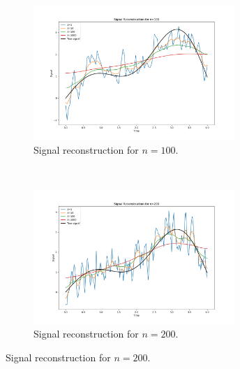 \documentclass{article}
\begin{document}
\begin{figure}[t!]
    \centering
    \caption{Signal reconstructions and error analysis for different problem sizes.}
    \label{fig:signal_reconstructions_and_error_analysis}
    
    \begin{subfigure}[t]{0.5\textwidth}
        \centering
        \includegraphics[height=2.0in]{signalplot_100.png}
        \caption{Signal reconstruction for $n=100$.}
        \label{fig:signal100}
    \end{subfigure}%
    ~ %
    \begin{subfigure}[t]{0.5\textwidth}
        \centering
        \includegraphics[height=2.0in]{signalplot_200.png}
        \caption{Signal reconstruction for $n=200$.}
        \label{fig:signal200}
    \end{subfigure}
    

\end{figure}
\end{document}
